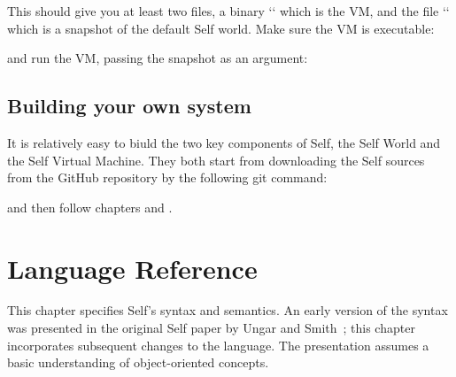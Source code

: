\documentclass[letterpaper,10pt,english]{sphinxmanual}
\begin{document}
This should give you at least two files, a binary `` which is the VM, and the file `` which is a snapshot of the default Self world. Make sure the VM is executable:

\begin{sphinxVerbatim}[commandchars=\\\{\}]
  
\end{sphinxVerbatim}

and run the VM, passing the snapshot as an argument:

\begin{sphinxVerbatim}[commandchars=\\\{\}]
  
\end{sphinxVerbatim}


\section{Building your own system}
\label{\detokenize{gettingstarted:building-your-own-system}}
It is relatively easy to biuld the two key components of Self, the Self World and the Self Virtual Machine. They both start from downloading the Self sources from the GitHub repository by the following git command:

\begin{sphinxVerbatim}[commandchars=\\\{\}]
  
\end{sphinxVerbatim}

and then follow chapters {\hyperref[\detokenize{buildvm:building-a-vm}]{}} {\hyperref[\detokenize{buildvm::doc}]{}} and {\hyperref[\detokenize{buildworld:building-a-world}]{}} {\hyperref[\detokenize{buildworld::doc}]{}}.
\label{\detokenize{langref:pp-langref}}

\chapter{Language Reference}
\label{\detokenize{langref:langref}}\label{\detokenize{langref::doc}}\label{\detokenize{langref:language-reference}}
This chapter specifies Self’s syntax and semantics. An early version of the syntax was presented
in the original Self paper by Ungar and Smith {\hyperref[\detokenize{ref:citations}]{}} ; this chapter incorporates subsequent
changes to the language. The presentation assumes a basic understanding of object-oriented concepts.
\end{document}
